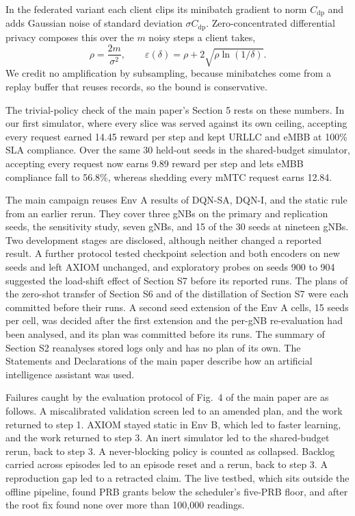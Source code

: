 \documentclass[9pt]{extarticle}
\begin{document}
In the federated variant each client clips its minibatch gradient to norm $C_{\text{dp}}$ and adds Gaussian noise of standard deviation $\sigma C_{\text{dp}}$. Zero-concentrated differential privacy composes this over the $m$ noisy steps a client takes,
\begin{equation}
\label{eq:zcdp}
\rho=\frac{2m}{\sigma^{2}},\qquad
\varepsilon(\delta)=\rho+2\sqrt{\rho\ln(1/\delta)}.
\end{equation}
We credit no amplification by subsampling, because minibatches come from a replay buffer that reuses records, so the bound is conservative.

The trivial-policy check of the main paper's Section 5 rests on these numbers. In our first simulator, where every slice was served against its own ceiling, accepting every request earned 14.45 reward per step and kept URLLC and eMBB at 100\% SLA compliance. Over the same 30 held-out seeds in the shared-budget simulator, accepting every request now earns 9.89 reward per step and lets eMBB compliance fall to 56.8\%, whereas shedding every mMTC request earns 12.84.

The main campaign reuses Env A results of DQN-SA, DQN-I, and the static rule from an earlier rerun. They cover three gNBs on the primary and replication seeds, the sensitivity study, seven gNBs, and 15 of the 30 seeds at nineteen gNBs. Two development stages are disclosed, although neither changed a reported result. A further protocol tested checkpoint selection and both encoders on new seeds and left AXIOM unchanged, and exploratory probes on seeds 900 to 904 suggested the load-shift effect of Section S7 before its reported runs. The plans of the zero-shot transfer of Section S6 and of the distillation of Section S7 were each committed before their runs. A second seed extension of the Env A cells, 15 seeds per cell, was decided after the first extension and the per-gNB re-evaluation had been analysed, and its plan was committed before its runs. The summary of Section S2 reanalyses stored logs only and has no plan of its own. The Statements and Declarations of the main paper describe how an artificial intelligence assistant was used.

Failures caught by the evaluation protocol of Fig.~4 of the main paper are as follows. A miscalibrated validation screen led to an amended plan, and the work returned to step 1. AXIOM stayed static in Env B, which led to faster learning, and the work returned to step 3. An inert simulator led to the shared-budget rerun, back to step 3. A never-blocking policy is counted as collapsed. Backlog carried across episodes led to an episode reset and a rerun, back to step 3. A reproduction gap led to a retracted claim. The live testbed, which sits outside the offline pipeline, found PRB grants below the scheduler's five-PRB floor, and after the root fix found none over more than 100{,}000 readings.
\end{document}
